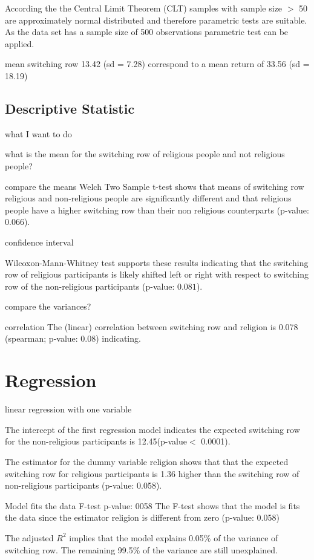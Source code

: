 \documentclass[12pt,a4paper]{article}
\begin{document}
According the the Central Limit Theorem (CLT) samples with sample size $>$ 50 are approximately normal distributed and therefore parametric tests are suitable. As the data set has a sample size of 500 observations parametric test can be applied. 
 


mean switching row 13.42 (sd = 7.28) correspond to a mean return of 33.56 (sd = 18.19)


\subsection{Descriptive Statistic}
what I want to do 

what is the mean for the switching row of religious people and not religious people? 


compare the means 
Welch Two Sample t-test shows that means of switching row religious and non-religious people are significantly different and that religious people have a higher switching row than their non religious counterparts (p-value: $0.066$). 


confidence interval 

Wilcoxon-Mann-Whitney test supports these results indicating that the switching row of religious participants is likely shifted left or right with respect to switching row of the non-religious participants (p-value: $0.081$). 

compare the variances? 

correlation 
The (linear) correlation between switching row and religion is 0.078 (spearman; p-value: 0.08) indicating.  

\section{Regression}
linear regression with one variable

The intercept of the first regression model indicates the expected switching row for the non-religious participants is 12.45(p-value$<$ 0.0001). 
 
The estimator for the dummy variable religion shows that that the expected switching row for religious participants is 1.36 higher than the switching row of non-religious participants (p-value: 0.058).

Model fits the data F-test p-value: 0058
The F-test shows that the model is fits the data since the estimator religion is different from zero (p-value: 0.058) 

The adjusted $R^2$ implies that the model explains 0.05\% of the variance of switching row. The remaining 99.5\% of the variance are still unexplained. 
 
\end{document}
